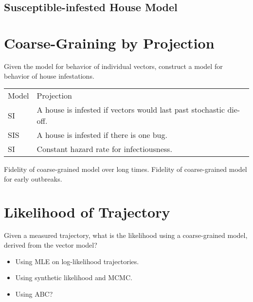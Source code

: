 \documentclass{article}
\begin{document}
\subsection{Susceptible-infested House Model}



\section{Coarse-Graining by Projection}
Given the model for behavior of individual vectors, construct a 
model for behavior of house infestations.

\begin{tabular}{ll}
Model & Projection \\
SI & A house is infested if vectors would last past stochastic die-off. \\
SIS & A house is infested if there is one bug. \\
SI & Constant hazard rate for infectiousness.
\end{tabular}

Fidelity of coarse-grained model over long times.
Fidelity of coarse-grained model for early outbreaks.



\section{Likelihood of Trajectory}
Given a measured trajectory, what is the likelihood using
a coarse-grained model, derived from the vector model?

\begin{itemize}
\item Using MLE on log-likelihood trajectories.
\item Using synthetic likelihood and MCMC.
\item Using ABC?
\end{itemize}




\end{document}
